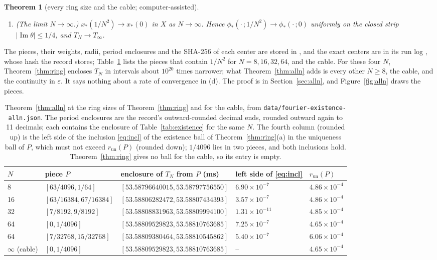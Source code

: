 \documentclass[11pt]{article}
\newtheorem{theorem}{Theorem}
\theoremstyle{definition}
\newcommand{\im}{\operatorname{Im}}
\begin{document}
\begin{theorem}[every ring size and the cable; computer-assisted]
\begin{enumerate}
\item[(d)] (The limit $N \to \infty$.) $x_*(1/N^2) \to x_*(0)$ in $X$ as $N \to \infty$. Hence $\phi_*(\cdot\,;1/N^2) \to \phi_*(\cdot\,;0)$ uniformly on the closed strip $|\im\theta| \le 1/4$, and $T_N \to T_\infty$.
\end{enumerate}
\end{theorem}

The pieces, their weights, radii, period enclosures and the SHA-256 of each center are stored in , and the exact centers are in its run log , whose hash the record stores; Table~\ref{tab:alln} lists the pieces that contain $1/N^2$ for $N = 8, 16, 32, 64$, and the cable. For these four $N$, Theorem~\ref{thm:ring} encloses $T_N$ in intervals about $10^{20}$ times narrower; what Theorem~\ref{thm:alln} adds is every other $N \ge 8$, the cable, and the continuity in $\varepsilon$. It says nothing about a rate of convergence in (d). The proof is in Section~\ref{sec:alln}, and Figure~\ref{fig:alln} draws the pieces.

\begin{table}[ht]
\centering\small
\begin{tabular}{@{}lllll@{}}
\toprule
$N$ & piece $P$ & enclosure of $T_N$ from $P$ (ms) & left side of \eqref{eq:incl} & $r_{\mathrm{un}}(P)$ \\
\midrule
8 & $[63/4096, 1/64]$ & $[53.58796640015, 53.58797756550]$ & $6.90 \times 10^{-7}$ & $4.86 \times 10^{-4}$ \\
16 & $[63/16384, 67/16384]$ & $[53.58806282472, 53.58807434393]$ & $3.57 \times 10^{-7}$ & $4.86 \times 10^{-4}$ \\
32 & $[7/8192, 9/8192]$ & $[53.58808831963, 53.58809994100]$ & $1.31 \times 10^{-11}$ & $4.85 \times 10^{-4}$ \\
64 & $[0, 1/4096]$ & $[53.58809529823, 53.58810763685]$ & $7.25 \times 10^{-7}$ & $4.65 \times 10^{-4}$ \\
64 & $[7/32768, 15/32768]$ & $[53.58809380464, 53.58810545862]$ & $5.40 \times 10^{-7}$ & $6.06 \times 10^{-4}$ \\
$\infty$ (cable) & $[0, 1/4096]$ & $[53.58809529823, 53.58810763685]$ & -- & $4.65 \times 10^{-4}$ \\
\bottomrule
\end{tabular}
\caption{Theorem~\ref{thm:alln} at the ring sizes of Theorem~\ref{thm:ring} and for the cable, from \texttt{data/\allowbreak fourier-existence-alln.json}. The period enclosures are the record's outward-rounded decimal ends, rounded outward again to 11 decimals; each contains the enclosure of Table~\ref{tab:existence} for the same $N$. The fourth column (rounded up) is the left side of the inclusion \eqref{eq:incl} of the existence ball of Theorem~\ref{thm:ring}(a) in the uniqueness ball of $P$, which must not exceed $r_{\mathrm{un}}(P)$ (rounded down); $1/4096$ lies in two pieces, and both inclusions hold. Theorem~\ref{thm:ring} gives no ball for the cable, so its entry is empty.}
\label{tab:alln}
\end{table}
\end{document}
